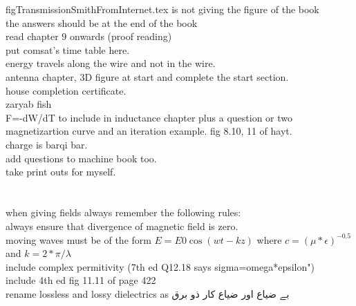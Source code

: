 \begin{otherlanguage}{english}
figTransmissionSmithFromInternet.tex is not giving the figure of the book\\
the answers should be at the end of the book\\
read chapter 9 onwards (proof reading)\\
put comsat's time table here.\\
energy travels along the wire and not in the wire.\\
antenna chapter, 3D figure at start and complete the start section.\\
house completion certificate.\\
zaryab fish\\
F=-dW/dT to include in inductance chapter plus a question or two\\
magnetizartion curve and an iteration example. fig 8.10, 11 of hayt.\\
charge is barqi bar.\\
add questions to machine book too.\\
take print outs for myself.\\
\\
\\
when giving fields always remember the following rules:\\
always ensure that divergence of magnetic field is zero.\\
moving waves must be of the form $E=E0 \cos(wt-kz)$ where $c=(\mu*\epsilon)^{-0.5}$ and $k=2*\pi/\lambda$\\
include complex permitivity  (7th ed Q12.18 says sigma=omega*epsilon")\\
include 4th ed fig 11.11 of page 422\\
rename lossless and lossy dielectrics as بے ضیاع اور ضیاع کار ذو برق
\end{otherlanguage}
